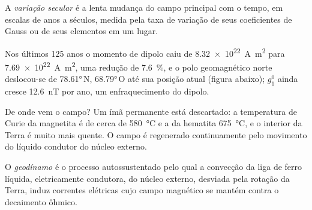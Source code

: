 \begin{definition}\label{def:b3:palaeomagnetism:secular}
A \emph{variação secular} é a lenta mudança do
campo principal com o tempo, em escalas de anos a séculos, medida pela taxa de
variação de seus coeficientes de Gauss ou de seus elementos em um lugar.
\end{definition}

Nos últimos 125 anos o momento de dipolo caiu de
\qty{8.32e22}{A.m^2} para \qty{7.69e22}{A.m^2}, uma redução de \qty{7.6}{\percent}, e o
polo geomagnético norte deslocou-se de \ang{78.61}\,N, \ang{68.79}\,O até sua
posição atual (figura abaixo); $g_1^0$ ainda cresce \qty{12.6}{nT} por ano,
um enfraquecimento do dipolo.

\begin{omfigure}

\par{}\label{fig:b3:palaeomagnetism:dipole}
\end{omfigure}

De onde vem o campo? Um ímã permanente está descartado: a temperatura
de Curie da magnetita é de cerca de \qty{580}{\celsius} e a da hematita
\qty{675}{\celsius}, e o interior da Terra é muito mais quente. O campo é
regenerado continuamente pelo movimento do líquido condutor do núcleo
externo.

\begin{definition}[Geodínamo]\label{def:b3:palaeomagnetism:geodynamo}
O \emph{geodínamo} é o processo autossustentado pelo qual a
convecção da liga de ferro líquida, eletricamente condutora, do núcleo externo,
desviada pela rotação da Terra, induz correntes elétricas cujo campo
magnético se mantém contra o decaimento ôhmico.
\end{definition}

